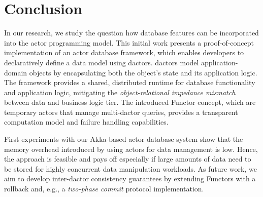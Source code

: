 
\section{Conclusion}\label{sec:conclusion}

In our research, we study the question how database features can be incorporated into the actor programming model. This initial work presents a proof-of-concept implementation of an actor database framework, which enables developers to declaratively define a data model using \glspl{dactor}.
\Glspl{dactor} model application-domain objects by encapsulating both the object's state and its application logic.
The framework provides a shared, distributed runtime for database functionality and application logic, mitigating the \textit{object-relational impedance mismatch} between data and business logic tier.
The introduced Functor concept, which are temporary actors that manage multi-\gls{dactor} queries, provides a transparent computation model and failure handling capabilities.

First experiments with our Akka-based actor database system show that the memory overhead introduced by using actors for data management is low.
Hence, the approach is feasible and pays off especially if large amounts of data need to be stored for highly concurrent data manipulation workloads.
As future work, we aim to develop inter-\gls{dactor} consistency guarantees by extending Functors with a rollback and, e.g., a \textit{two-phase commit} protocol implementation.

